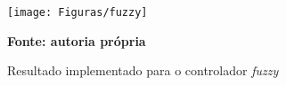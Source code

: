 \begin{figure}[ht]
\centering
\caption{Resultado implementado para o controlador \textit{fuzzy}}
\label{fig:resultadoImplementadoFuzzy}
		\centering
		\texttt{[image: Figuras/fuzzy]}

	\textbf{Fonte: autoria própria}
\end{figure}